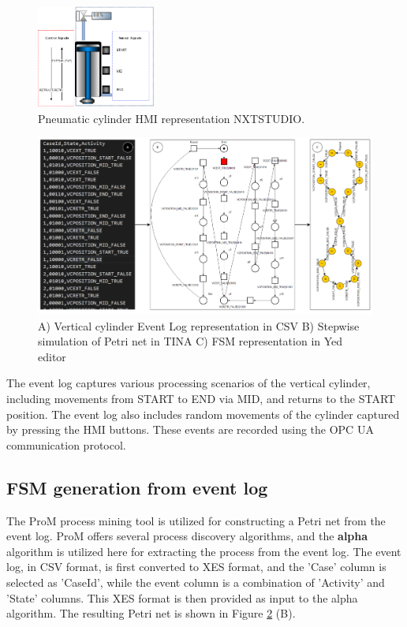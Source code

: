 \documentclass{ieeeojies}
\begin{document}
\begin{figure}[!t]
	\centering
	\includegraphics[width=0.35\textwidth]{images/CylinderHMI.png}
	\caption{Pneumatic cylinder HMI representation NXTSTUDIO.}
	\label{VC_NXT_HMI}
\end{figure}



\begin{figure}[!t]
	\centering
	\includegraphics[width=1\textwidth]{images/EL2FSM.png}
	\caption{A) Vertical cylinder Event Log representation in CSV B) Stepwise simulation of Petri net in TINA C) FSM representation in Yed editor}
	\label{EL2FSM}
\end{figure}


The event log captures various processing scenarios of the vertical cylinder, including movements from START to END via  MID,
  and returns to the START position. The event log also includes random movements of the cylinder captured by pressing the HMI buttons. These events are recorded using the OPC UA communication protocol.


\subsection{ FSM generation from event log}

The ProM process mining tool is utilized for constructing a Petri net from the event log. ProM offers several process discovery algorithms, and the \textbf{alpha} algorithm is utilized here for extracting the process from the event log. The event log, in CSV format, is first converted to XES format, and the 'Case' column is selected as 'CaseId', while the event column is a combination of 'Activity' and 'State' columns. This XES format is then provided as input to the alpha algorithm. The resulting Petri net is shown in Figure \ref{EL2FSM} (B).
\end{document}
